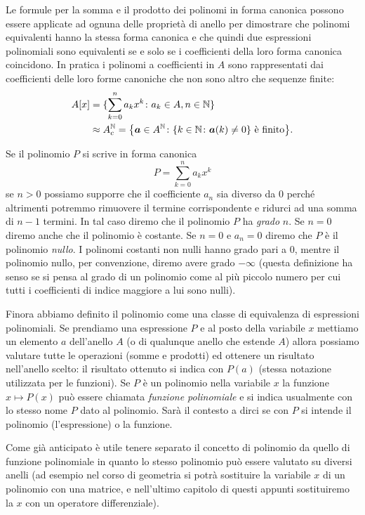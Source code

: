 Le formule per la somma e il prodotto dei polinomi in forma canonica 
possono essere applicate ad ognuna delle proprietà di anello per dimostrare
che polinomi equivalenti hanno la stessa forma canonica e che quindi 
due espressioni polinomiali sono equivalenti se e solo se i coefficienti 
della loro forma canonica coincidono.
In pratica i polinomi a coefficienti in $A$ sono 
rappresentati dai coefficienti delle loro forme canoniche che 
non sono altro che sequenze finite:
\begin{align*}
  A[x] 
  &= \{\sum_{k=0}^n a_k x^k\colon a_k\in A, n\in {\mathbb N}\}\\
  &\approx A^{\mathbb N}_c 
  = {\left\{ \boldsymbol a \in A^{\mathbb N}\colon {\left\{ k\in {\mathbb N}\colon \boldsymbol a(k)\neq 0 \right\}} \text{ è finito} \right\}}.  
\end{align*}

Se il polinomio $P$ si scrive in forma canonica
\[
  P = \sum_{k=0}^n a_k x^k
\]
se $n>0$ possiamo supporre che il coefficiente $a_n$ sia diverso da $0$ 
perché altrimenti potremmo rimuovere il termine corrispondente e ridurci 
ad una somma di $n-1$ termini. 
In tal caso diremo che il polinomio $P$ ha \emph{grado}%
%
 $n$.
%
% 
Se $n=0$ diremo anche che il polinomio è costante.
Se $n=0$ e $a_n=0$ diremo che $P$ è il polinomio \emph{nullo}.
I polinomi costanti non nulli hanno grado pari a $0$, mentre il polinomio nullo, 
per convenzione, diremo avere grado $-\infty$ (questa definizione ha senso se si pensa 
al grado di un polinomio come al più piccolo numero per cui tutti i coefficienti di
indice maggiore a lui sono nulli).

Finora abbiamo definito il polinomio come una classe di equivalenza di 
espressioni polinomiali. 
Se prendiamo una espressione $P$ e al posto della variabile $x$ 
mettiamo un elemento $a$ dell'anello $A$ (o di qualunque anello che estende 
$A$) allora possiamo valutare tutte le operazioni (somme e prodotti) ed 
ottenere un risultato nell'anello scelto: il risultato 
ottenuto si indica con $P(a)$ (stessa notazione utilizzata per le funzioni).
Se $P$ è un polinomio nella variabile $x$ la funzione $x\mapsto P(x)$ 
può essere chiamata \emph{funzione polinomiale}%
%
 e si indica usualmente 
con lo stesso nome $P$ dato al polinomio. Sarà il contesto a dirci 
se con $P$ si intende il polinomio (l'espressione) o la funzione.

Come già anticipato è utile tenere separato il concetto di polinomio da quello di 
funzione polinomiale in quanto lo stesso polinomio può essere valutato su diversi 
anelli (ad esempio nel corso di geometria si potrà sostituire
la variabile $x$ di un polinomio con una matrice, 
e nell'ultimo capitolo di questi appunti 
sostituiremo la $x$ con un operatore differenziale).

